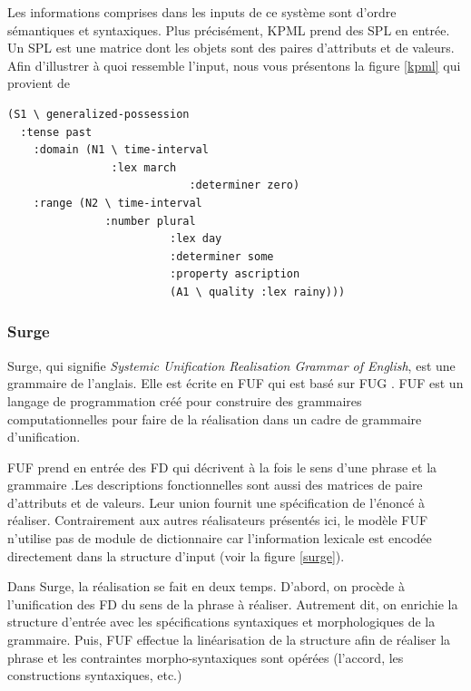 Les informations comprises dans les inputs de ce système sont d'ordre sémantiques et syntaxiques. Plus précisément, KPML prend des \acf{SPL} en entrée. Un \ac{SPL} est une matrice dont les objets sont des paires d'attributs et de valeurs. Afin d'illustrer à quoi ressemble l'input, nous vous présentons la figure \ref{kpml} qui provient de \cite{ReiterBuildingNaturalLanguage2000} 
\begin{lstlisting}[language=Xml, caption=SPL: input de KPML, label=kpml]
(S1 \ generalized-possession
  :tense past 
	:domain (N1 \ time-interval
	            :lex march
							:determiner zero)
	:range (N2 \ time-interval
	           :number plural
						 :lex day
						 :determiner some
						 :property ascription
						 (A1 \ quality :lex rainy)))
\end{lstlisting}

\subsubsection{Surge}
Surge, qui signifie \emph{Systemic Unification Realisation Grammar of English}, est une grammaire de l'anglais\citep{Elhadad98surge:a}. Elle est écrite en \acf{FUF} qui est basé sur \acf{FUG} \citep{KayFunctionalUnificationGrammar1984}. \ac{FUF} est un langage de programmation créé pour construire des grammaires computationnelles pour faire de la réalisation dans un cadre de grammaire d'unification.

\ac{FUF} prend en entrée des \acf{FD} qui décrivent à la fois le sens d'une phrase et la grammaire .Les descriptions fonctionnelles sont aussi des matrices de paire d'attributs et de valeurs. Leur union fournit une spécification de l'énoncé à réaliser. Contrairement aux autres réalisateurs présentés ici, le modèle \ac{FUF} n'utilise pas de module de dictionnaire car l'information lexicale est encodée directement dans la structure d'input (voir la figure \ref{surge}).

Dans Surge, la réalisation se fait en deux temps. D'abord, on procède à l'unification des \ac{FD} du sens de la phrase à réaliser. Autrement dit, on enrichie la structure d’entrée avec les spécifications syntaxiques et morphologiques de la grammaire. Puis, \ac{FUF} effectue la linéarisation de la structure afin de réaliser la phrase et les contraintes morpho-syntaxiques sont opérées (l'accord, les constructions syntaxiques, etc.)

